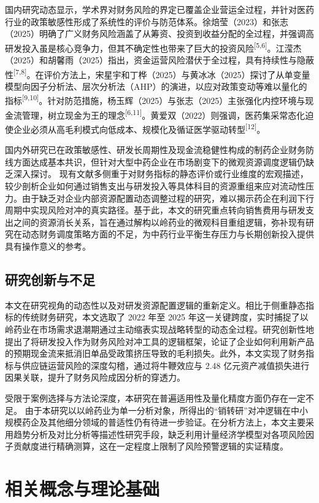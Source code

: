 \documentclass[12pt,a4paper,fontset=windows,UTF8]{ctexart}
\begin{document}
国内研究动态显示，学术界对财务风险的界定已覆盖企业营运全过程，并针对医药行业的政策敏感性形成了系统性的评价与防范体系。徐焙莹（2023）和张志（2025）明确了广义财务风险涵盖了从筹资、投资到收益分配的全过程，并强调高研发投入虽是核心竞争力，但其不确定性也带来了巨大的投资风险\textsuperscript{[5,6]}。江滢杰（2025）和胡馨雨（2025）指出，资金运营风险潜伏于全过程，具有持续性与隐蔽性\textsuperscript{[7,8]}。在评价方法上，宋星宇和丁桦（2025）与黄冰冰（2025）探讨了从单变量模型向因子分析法、层次分析法（AHP）的演进，以应对政策变动等难以量化的指标\textsuperscript{[9,10]}。针对防范措施，杨玉辉（2025）与张志（2025）主张强化内控环境与现金流管理，树立现金为王的理念\textsuperscript{[6,11]}。黄爱双（2022）则强调，医药集采常态化迫使企业必须从高毛利模式向低成本、规模化及循证医学驱动转型\textsuperscript{[12]}。

国内外研究已在政策敏感性、研发长周期性及现金流稳健性构成的制药企业财务防线方面达成基本共识，但针对大型中药企业在市场剧变下的微观资源调度逻辑仍缺乏深入探讨。 现有文献多侧重于对财务指标的静态评价或行业维度的宏观描述，较少剖析企业如何通过销售支出与研发投入等具体科目的资源重组来应对流动性压力。由于缺乏对企业内部资源配置动态调整过程的研究，难以揭示药企在利润下行周期中实现风险对冲的真实路径。基于此，本文的研究重点转向销售费用与研发支出之间的资源消长关系，旨在通过解构以岭药业的微观科目重组逻辑，弥补现有研究在动态财务调度策略方面的不足，为中药行业平衡生存压力与长期创新投入提供具有操作意义的参考。

\subsection{研究创新与不足}
本文在研究视角的动态性以及对研发资源配置逻辑的重新定义。相比于侧重静态指标的传统财务研究，本文选取了 2022 年至 2025 年这一关键跨度，实时捕捉了以岭药业在市场需求退潮期通过主动缩表实现战略转型的动态全过程。研究创新性地提出了将研发投入作为财务风险对冲工具的逻辑框架，论证了企业如何利用新产品的预期现金流来抵消旧单品受政策挤压导致的毛利损失。此外，本文实现了财务指标与供应链运营风险的深度勾稽，通过将牛鞭效应与 2.48 亿元资产减值损失进行因果关联，提升了财务风险成因分析的穿透力。

受限于案例选择与方法论深度，本研究在普遍适用性及量化精度方面仍存在一定不足。 由于本研究以以岭药业为单一分析对象，所得出的“销转研”对冲逻辑在中小规模药企及其他细分领域的普适性仍有待进一步验证。在分析方法上，本文主要采用趋势分析及对比分析等描述性研究手段，缺乏利用计量经济学模型对各项风险因子贡献度进行精确测算，这在一定程度上限制了风险预警逻辑的实证精度。

\section{相关概念与理论基础}
\end{document}
